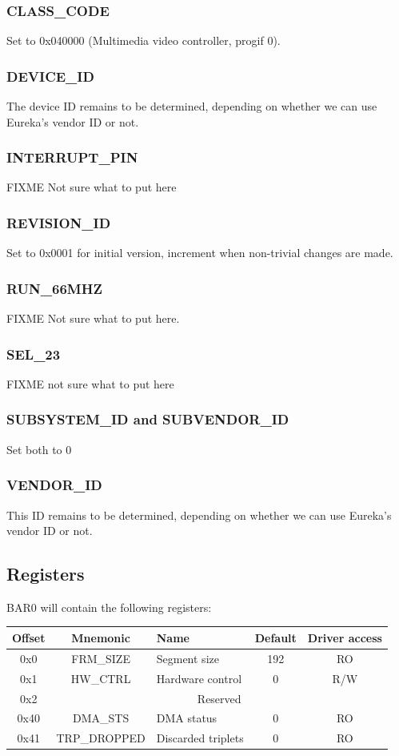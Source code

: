 \documentclass[12pt]{article}
\begin{document}
\subsubsection{CLASS\_CODE}
Set to 0x040000 (Multimedia video controller, progif 0).

\subsubsection{DEVICE\_ID}
The device ID remains to be determined, depending on whether we can use Eureka's vendor ID or not.

\subsubsection{INTERRUPT\_PIN}
FIXME Not sure what to put here

\subsubsection{REVISION\_ID}
Set to 0x0001 for initial version, increment when non-trivial changes are made.

\subsubsection{RUN\_66MHZ}
FIXME Not sure what to put here.

\subsubsection{SEL\_23}
FIXME not sure what to put here

\subsubsection{SUBSYSTEM\_ID and SUBVENDOR\_ID}
Set both to 0

\subsubsection{VENDOR\_ID}
This ID remains to be determined, depending on whether we can use Eureka's vendor ID or not.

\subsection{Registers}

BAR0 will contain the following registers:

\begin{tabular}{|c|c|l|c|c|} \hline
\textbf{Offset} & \textbf{Mnemonic} & \textbf{Name} & \textbf{Default} & \textbf{Driver access} \\ \hline
0x0 & FRM\_SIZE & Segment size & 192 & RO \\ \hline
0x1 & HW\_CTRL & Hardware control & 0 & R/W \\ \hline
0x2 & \multicolumn{4}{|c|}{Reserved} \\ \hline
0x40 & DMA\_STS & DMA status & 0 & RO \\ \hline
0x41 & TRP\_DROPPED & Discarded triplets & 0 & RO \\ \hline
\end{tabular}
\end{document}
